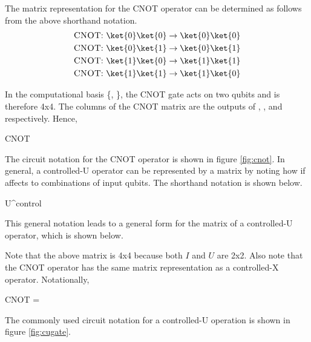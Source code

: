 \beq
{}  \rightarrow {}
\eeq

The matrix representation for the \textsc{CNOT} operator can be determined as follows from the above shorthand notation.
\begin{align}
\text{\textsc{CNOT}: } \ket{0}\ket{0} &\rightarrow \ket{0}\ket{0}\\
\text{\textsc{CNOT}: } \ket{0}\ket{1} &\rightarrow \ket{0}\ket{1}\\
\text{\textsc{CNOT}: } \ket{1}\ket{0} &\rightarrow \ket{1}\ket{1}\\
\text{\textsc{CNOT}: } \ket{1}\ket{1} &\rightarrow \ket{1}\ket{0}
\end{align}

In the computational basis \{, \}, the \textsc{CNOT} gate acts on two qubits and is therefore 4x4. The columns of the \textsc{CNOT} matrix are the outputs of , ,  and  respectively. Hence,

\beq
\textsc{CNOT} \equiv {}
\eeq


The circuit notation for the \textsc{CNOT} operator is shown in figure \ref{fig:cnot}. In general, a controlled-U operator can be represented by a matrix by noting how if affects to combinations of input qubits. The shorthand notation is shown below.

\beq
{}  \rightarrow {}U^{control}
\eeq

This general notation leads to a general form for the matrix of a controlled-U operator, which is shown below.

\beq
{} \equiv {}
\eeq

Note that the above matrix is 4x4 because both $I$ and $U$ are 2x2. Also note that the \textsc{CNOT} operator has the same matrix representation as a controlled-X operator. Notationally,

\beq
\textsc{CNOT} \equiv {} = 
\eeq

The commonly used circuit notation for a controlled-U operation is shown in figure \ref{fig:cugate}.


